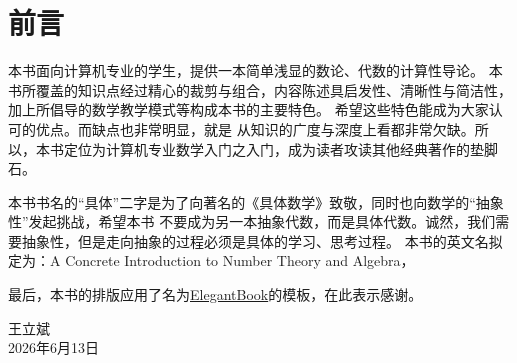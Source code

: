 \chapter*{前言}
本书面向计算机专业的学生，提供一本简单浅显的数论、代数的计算性导论。
本书所覆盖的知识点经过精心的裁剪与组合，内容陈述具启发性、清晰性与简洁性，加上所倡导的数学教学模式等构成本书的主要特色。
希望这些特色能成为大家认可的优点。而缺点也非常明显，就是
从知识的广度与深度上看都非常欠缺。所以，本书定位为计算机专业数学入门之入门，成为读者攻读其他经典著作的垫脚石。

本书书名的“具体”二字是为了向著名的《具体数学》\cite{GKP94}致敬，同时也向数学的“抽象性”发起挑战，希望本书
不要成为另一本抽象代数，而是具体代数。诚然，我们需要抽象性，但是走向抽象的过程必须是具体的学习、思考过程。
本书的英文名拟定为：A Concrete Introduction to Number Theory and Algebra，

最后，本书的排版应用了名为\href{https://github.com/ElegantLaTeX/}{ElegantBook}的模板，在此表示感谢。
\vskip 1.5cm

\begin{flushright}
王立斌\\
2026年6月13日
\end{flushright}